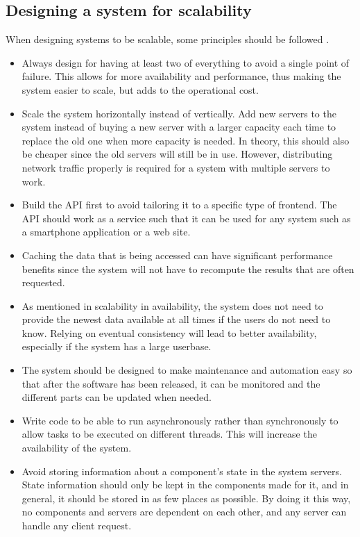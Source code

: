 \subsection{Designing a system for scalability}
When designing systems to be scalable, some principles should be followed \cite{ScalabilityDesignPrinciples}.
\begin{itemize}
    \item Always design for having at least two of everything to avoid a single point of failure. 
    This allows for more availability and performance, thus making the system easier to scale, but adds to the operational cost.
    \item Scale the system horizontally instead of vertically.
    Add new servers to the system instead of buying a new server with a larger capacity each time to replace the old one when more capacity is needed. 
    In theory, this should also be cheaper since the old servers will still be in use. 
    However, distributing network traffic properly is required for a system with multiple servers to work.
    \item Build the API first to avoid tailoring it to a specific type of frontend. 
    The API should work as a service such that it can be used for any system such as a smartphone application or a web site. 
    \item Caching the data that is being accessed can have significant performance benefits since the system will not have to recompute the results that are often requested. 
    \item As mentioned in scalability in availability, the system does not need to provide the newest data available at all times if the users do not need to know. 
    Relying on eventual consistency will lead to better availability, especially if the system has a large userbase.
    \item The system should be designed to make maintenance and automation easy so that after the software has been released, it can be monitored and the different parts can be updated when needed.
    \item Write code to be able to run asynchronously rather than synchronously to allow tasks to be executed on different threads. This will increase the availability of the system.
    \item Avoid storing information about a component's state in the system servers. 
    State information should only be kept in the components made for it, and in general, it should be stored in as few places as possible. 
    By doing it this way, no components and servers are dependent on each other, and any server can handle any client request. 
\end{itemize}
